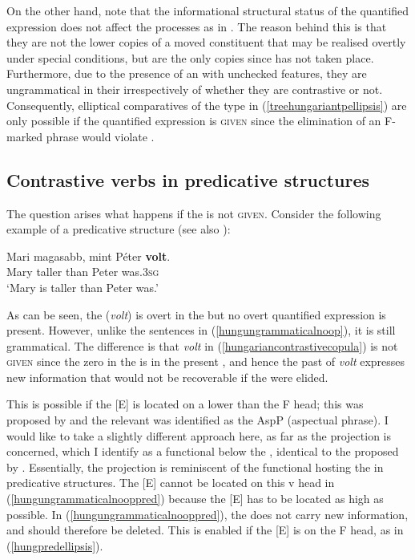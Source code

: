 On the other hand, note that the informational structural status of the quantified expression does not affect the  processes as in . The reason behind this is that they are not the lower copies of a moved constituent that may be realised overtly under special conditions, but are the only copies since  has not taken place. Furthermore, due to the presence of an  with unchecked features, they are ungrammatical in their  irrespectively of whether they are contrastive or not. Consequently, elliptical comparatives of the type in (\ref{treehungariantpellipsis}) are only possible if the quantified expression is \textsc{given} since the elimination of an F-marked phrase would violate .

\subsection{Contrastive verbs in predicative structures} \label{sec:6contrastiveverbs}
The question arises what happens if the  is not \textsc{given}. Consider the following example of a predicative structure (see also \citealt[55]{bacskaiatkarikantor2012}):

\ea \gll	Mari	magasabb,	mint	Péter	\textbf{volt}. \label{hungariancontrastivecopula}\\
Mary	taller	than	Peter	was.\textsc{3sg}\\
\glt `Mary is taller than Peter was.'
\z

As can be seen, the  (\textit{volt}) is overt in the  but no overt quantified expression is present. However, unlike the sentences in (\ref{hungungrammaticalnoop}), it is still grammatical. The difference is that \textit{volt} in (\ref{hungariancontrastivecopula}) is not \textsc{given} since the zero  in the  is in the present , and hence the past  of \textit{volt} expresses new information that would not be recoverable if the  were elided.

This is possible if the [E]  is located on a  lower than the F head; this was proposed by \citet{bacskaiatkarikantor2011} and the relevant  was identified as the AspP (aspectual phrase). I would like to take a slightly different approach here, as far as the projection is concerned, which I identify as a functional  below the , identical to the  proposed by \citet{ekiss2008li}. Essentially, the projection is reminiscent of the functional  hosting the  in  predicative structures. The [E]  cannot be located on this v head in (\ref{hungungrammaticalnooppred}) because the [E]  has to be located as high as possible. In (\ref{hungungrammaticalnooppred}), the  does not carry new information, and should therefore be deleted. This is enabled if the [E] is on the F head, as in (\ref{hungpredellipsis}).

